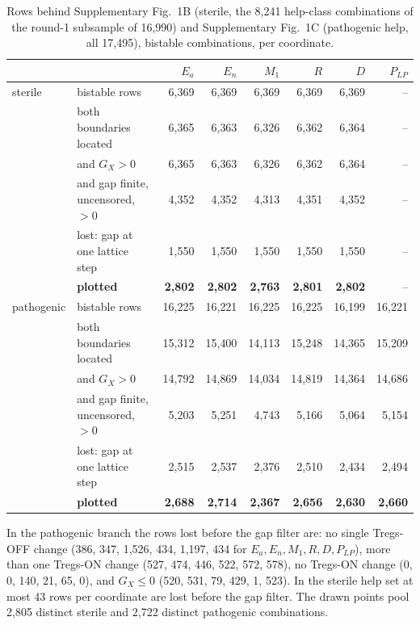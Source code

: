 \documentclass[11pt]{article}
\begin{document}
\begin{table}[H]
\centering
\caption{Rows behind Supplementary Fig.~1B (sterile, the 8{,}241 help-class combinations of the round-1
subsample of 16{,}990) and Supplementary Fig.~1C (pathogenic help, all 17{,}495), bistable combinations,
per coordinate.}
\label{tab:gainledger}
\small
\begin{tabular}{llrrrrrr}
\toprule
 & & $E_a$ & $E_n$ & $M_1$ & $R$ & $D$ & $P_{LP}$\\
\midrule
sterile & bistable rows & 6{,}369 & 6{,}369 & 6{,}369 & 6{,}369 & 6{,}369 & --\\
 & both boundaries located & 6{,}365 & 6{,}363 & 6{,}326 & 6{,}362 & 6{,}364 & --\\
 & and $G_X>0$ & 6{,}365 & 6{,}363 & 6{,}326 & 6{,}362 & 6{,}364 & --\\
 & and gap finite, uncensored, $>0$ & 4{,}352 & 4{,}352 & 4{,}313 & 4{,}351 & 4{,}352 & --\\
 & lost: gap at one lattice step & 1{,}550 & 1{,}550 & 1{,}550 & 1{,}550 & 1{,}550 & --\\
 & \textbf{plotted} & \textbf{2{,}802} & \textbf{2{,}802} & \textbf{2{,}763} & \textbf{2{,}801} & \textbf{2{,}802} & --\\
pathogenic & bistable rows & 16{,}225 & 16{,}221 & 16{,}225 & 16{,}225 & 16{,}199 & 16{,}221\\
 & both boundaries located & 15{,}312 & 15{,}400 & 14{,}113 & 15{,}248 & 14{,}365 & 15{,}209\\
 & and $G_X>0$ & 14{,}792 & 14{,}869 & 14{,}034 & 14{,}819 & 14{,}364 & 14{,}686\\
 & and gap finite, uncensored, $>0$ & 5{,}203 & 5{,}251 & 4{,}743 & 5{,}166 & 5{,}064 & 5{,}154\\
 & lost: gap at one lattice step & 2{,}515 & 2{,}537 & 2{,}376 & 2{,}510 & 2{,}434 & 2{,}494\\
 & \textbf{plotted} & \textbf{2{,}688} & \textbf{2{,}714} & \textbf{2{,}367} & \textbf{2{,}656} & \textbf{2{,}630} & \textbf{2{,}660}\\
\bottomrule
\end{tabular}
\end{table}
In the pathogenic branch the rows lost before the gap filter are: no single Tregs-OFF change
(386, 347, 1{,}526, 434, 1{,}197, 434 for $E_a, E_n, M_1, R, D, P_{LP}$), more than one
Tregs-ON change (527, 474, 446, 522, 572, 578), no Tregs-ON change (0, 0, 140, 21, 65, 0), and
$G_X \le 0$ (520, 531, 79, 429, 1, 523). In the sterile help set at most 43 rows per coordinate are lost
before the gap filter. The drawn points pool 2{,}805 distinct sterile and 2{,}722 distinct
pathogenic combinations.
\end{document}
